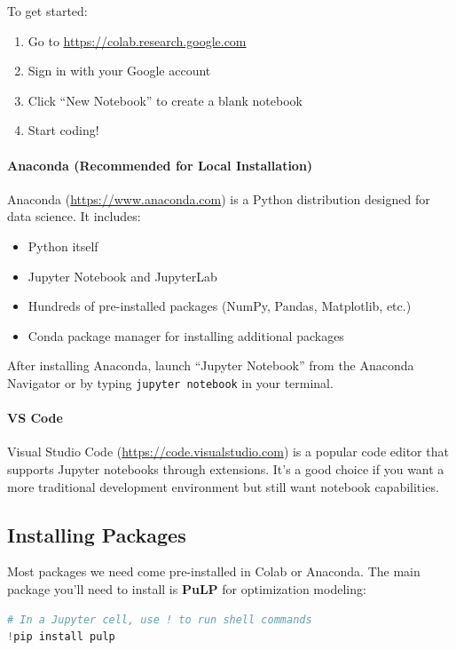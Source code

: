To get started:
\begin{enumerate}
\item Go to \url{https://colab.research.google.com}
\item Sign in with your Google account
\item Click ``New Notebook'' to create a blank notebook
\item Start coding!
\end{enumerate}

\paragraph{Anaconda (Recommended for Local Installation)}

Anaconda (\url{https://www.anaconda.com}) is a Python distribution designed for data science. It includes:
\begin{itemize}
\item Python itself
\item Jupyter Notebook and JupyterLab
\item Hundreds of pre-installed packages (NumPy, Pandas, Matplotlib, etc.)
\item Conda package manager for installing additional packages
\end{itemize}

After installing Anaconda, launch ``Jupyter Notebook'' from the Anaconda Navigator or by typing \texttt{jupyter notebook} in your terminal.

\paragraph{VS Code}

Visual Studio Code (\url{https://code.visualstudio.com}) is a popular code editor that supports Jupyter notebooks through extensions. It's a good choice if you want a more traditional development environment but still want notebook capabilities.

\subsection{Installing Packages}

Most packages we need come pre-installed in Colab or Anaconda. The main package you'll need to install is \textbf{PuLP} for optimization modeling:

\begin{lstlisting}[language=Python]
# In a Jupyter cell, use ! to run shell commands
!pip install pulp
\end{lstlisting}

